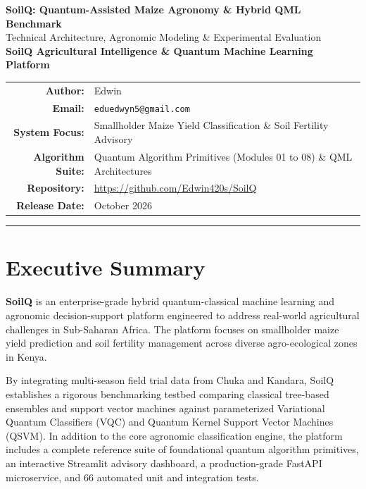 \documentclass[10pt,a4paper]{article}
\begin{document}
\begin{center}
    {\LARGE \textbf{SoilQ: Quantum-Assisted Maize Agronomy \& Hybrid QML Benchmark}}\\[6pt]
    {\large Technical Architecture, Agronomic Modeling \& Experimental Evaluation}\\[4pt]
    \textbf{SoilQ Agricultural Intelligence \& Quantum Machine Learning Platform}
    \vspace{8pt}

    \begin{tabular}{rl}
        \textbf{Author:} & Edwin \\
        \textbf{Email:} & \texttt{eduedwyn5@gmail.com} \\
        \textbf{System Focus:} & Smallholder Maize Yield Classification \& Soil Fertility Advisory \\
        \textbf{Algorithm Suite:} & Quantum Algorithm Primitives (Modules 01 to 08) \& QML Architectures \\
        \textbf{Repository:} & \url{https://github.com/Edwin420s/SoilQ} \\
        \textbf{Release Date:} & October 2026
    \end{tabular}
\end{center}

\hrule
\vspace{10pt}

\section{Executive Summary}
\textbf{SoilQ} is an enterprise-grade hybrid quantum-classical machine learning and agronomic decision-support platform engineered to address real-world agricultural challenges in Sub-Saharan Africa. The platform focuses on smallholder maize yield prediction and soil fertility management across diverse agro-ecological zones in Kenya.

By integrating multi-season field trial data from Chuka and Kandara, SoilQ establishes a rigorous benchmarking testbed comparing classical tree-based ensembles and support vector machines against parameterized Variational Quantum Classifiers (VQC) and Quantum Kernel Support Vector Machines (QSVM). In addition to the core agronomic classification engine, the platform includes a complete reference suite of foundational quantum algorithm primitives, an interactive Streamlit advisory dashboard, a production-grade FastAPI microservice, and 66 automated unit and integration tests.
\end{document}
